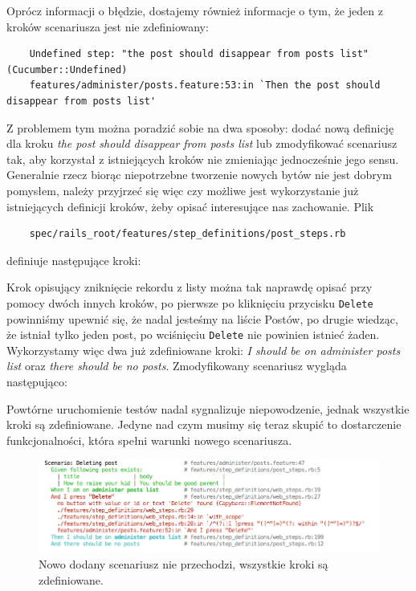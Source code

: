   	Oprócz informacji o błędzie, dostajemy również informacje o tym, że jeden z kroków scenariusza jest nie zdefiniowany:
  	
  	\begin{lstlisting}
    Undefined step: "the post should disappear from posts list" (Cucumber::Undefined)
    features/administer/posts.feature:53:in `Then the post should disappear from posts list'
    \end{lstlisting}
    
    Z problemem tym można poradzić sobie na dwa sposoby: dodać nową definicję dla kroku \emph{the post should disappear from posts list} lub zmodyfikować scenariusz tak, aby korzystał z istniejących kroków nie zmieniając jednocześnie jego sensu. Generalnie rzecz biorąc niepotrzebne tworzenie nowych bytów nie jest dobrym pomysłem, należy przyjrzeć się więc czy możliwe jest wykorzystanie już istniejących definicji kroków, żeby opisać interesujące nas zachowanie. Plik
    
    \begin{lstlisting}
    spec/rails_root/features/step_definitions/post_steps.rb
    \end{lstlisting}
    
    definiuje następujące kroki:
    
    
    
    Krok opisujący zniknięcie rekordu z listy można tak naprawdę opisać przy pomocy dwóch innych kroków, po pierwsze po kliknięciu przycisku \texttt{Delete} powinniśmy upewnić się, że nadal jesteśmy na liście Postów, po drugie wiedząc, że istniał tylko jeden post, po wciśnięciu \texttt{Delete} nie powinien istnieć żaden. Wykorzystamy więc dwa już zdefiniowane kroki: \emph{I should be on administer posts list} oraz \emph{there should be no posts}. Zmodyfikowany scenariusz wygląda następująco:
    
    
    
    Powtórne uruchomienie testów nadal sygnalizuje niepowodzenie, jednak wszystkie kroki są zdefiniowane. Jedyne nad czym musimy się teraz skupić to dostarczenie funkcjonalności, która spełni warunki nowego scenariusza.
     
     \clearpage
     
     \begin{figure}[!h]
   		\begin{center}
   			\includegraphics[width=\linewidth]{images/scenario_failure_2.png}
   			\caption{Nowo dodany scenariusz nie przechodzi, wszystkie kroki są zdefiniowane.}
   			\label{scenario_failure_2}
   		\end{center}
   	\end{figure}
   	
